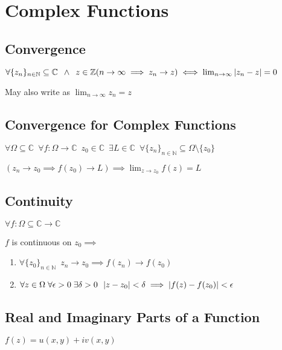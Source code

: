 \section{Complex Functions} %
\label{sec:complex_functions}

\subsection{Convergence} %
\label{sub:convergence}
$\forall \{z_n\}_{n \in \mathbb{N}} \subseteq \mathbb{C} \enspace \land \enspace z \in \mathbb{Z} \\
	(n \to \infty \implies z_n \to z) \iff \lim_{n \to \infty} \left|z_n - z\right| = 0$

May also write as $\lim_{n \to \infty} z_n = z$

\subsection{Convergence for Complex Functions} %
\label{sub:convergence_for_complex_functions}
$\forall \Omega \subseteq \mathbb{C} \enspace \forall f : \Omega \to \mathbb{C} \enspace z_0 \in \mathbb{C} \enspace \exists L \in \mathbb{C} \enspace \forall \{z_n\}_{n \in \mathbb{N}} \subseteq \Omega \setminus \{z_0\}$

$(z_n \to z_0 \implies f(z_0) \to L) \implies \lim_{z \to z_0} f(z) = L$

\subsection{Continuity} %
\label{sub:continuity}

$\forall f : \Omega \subseteq \mathbb{C} \to \mathbb{C}$

$f$ is continuous on $z_0 \implies$
\begin{enumerate}
	\item $\forall \{z_0\}_{n \in \mathbb{N}} \enspace z_n \to z_0 \implies f(z_n) \to f(z_0)$
	\item $\forall z \in \Omega \; \forall \epsilon > 0 \; \exists \delta > 0 \enspace \left|z - z_0\right| < \delta \implies \left|f(z) - f(z_0)\right| < \epsilon$
\end{enumerate}


\subsection{Real and Imaginary Parts of a Function} %
\label{sub:real_and_imaginary_parts_of_a_function}

$f(z) = u(x, y) + iv(x, y)$


